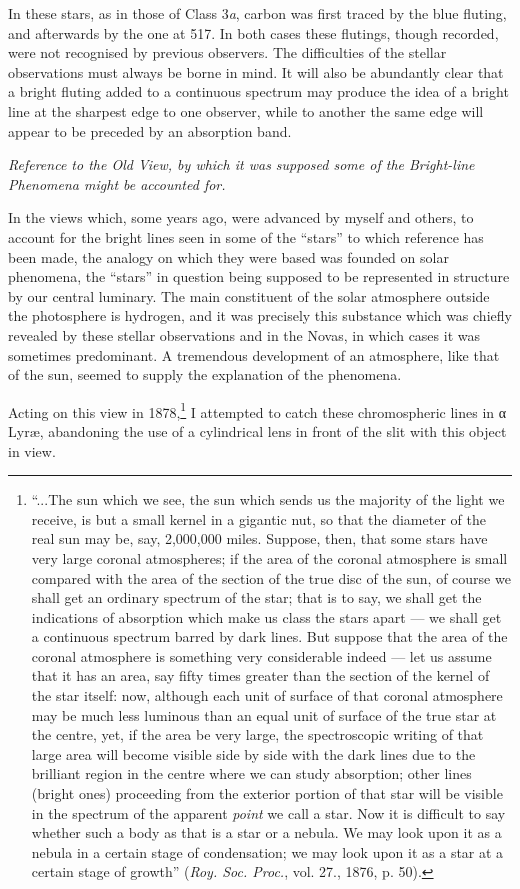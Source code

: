 \documentclass[a4paper, 12pt, oneside, polutonikogreek, english]{article}
\begin{document}
In these stars, as in those of Class 3\emph{a}, carbon was first traced by the blue fluting, and afterwards by the one at 517. In both cases these flutings, though recorded, were not recognised by previous observers. The difficulties of the stellar observations must always be borne in mind. It will also be abundantly clear that a bright fluting added to a continuous spectrum may produce the idea of a bright line at the sharpest edge to one observer, while to another the same edge will appear to be preceded by an absorption band.

\emph{Reference to the Old View, by which it was supposed some of the Bright-line Phenomena might be accounted for.}

In the views which, some years ago, were advanced by myself and others, to account for the bright lines seen in some of the ``stars'' to which reference has been made, the analogy on which they were based was founded on solar phenomena, the ``stars'' in question being supposed to be represented in structure by our central luminary. The main constituent of the solar atmosphere outside the photosphere is hydrogen, and it was precisely this substance which was chiefly revealed by these stellar observations and in the Novas, in which cases it was sometimes predominant. A tremendous development of an atmosphere, like that of the sun, seemed to supply the explanation of the phenomena.

Acting on this view in 1878,\footnote{``...The sun which we see, the sun which sends us the majority of the light we receive, is but a small kernel in a gigantic nut, so that the diameter of the real sun may be, say, 2,000,000 miles. Suppose, then, that some stars have very large coronal atmospheres; if the area of the coronal atmosphere is small compared with the area of the section of the true disc of the sun, of course we shall get an ordinary spectrum of the star; that is to say, we shall get the indications of absorption which make us class the stars apart --- we shall get a continuous spectrum barred by dark lines. But suppose that the area of the coronal atmosphere is something very considerable indeed --- let us assume that it has an area, say fifty times greater than the section of the kernel of the star itself: now, although each unit of surface of that coronal atmosphere may be much less luminous than an equal unit of surface of the true star at the centre, yet, if the area be very large, the spectroscopic writing of that large area will become visible side by side with the dark lines due to the brilliant region in the centre where we can study absorption; other lines (bright ones) proceeding from the exterior portion of that star will be visible in the spectrum of the apparent \emph{point} we call a star. Now it is difficult to say whether such a body as that is a star or a nebula. We may look upon it as a nebula in a certain stage of condensation; we may look upon it as a star at a certain stage of growth'' (\emph{Roy. Soc. Proc.}, vol. 27., 1876, p. 50).} I attempted to catch these chromospheric lines in α Lyræ, abandoning the use of a cylindrical lens in front of the slit with this object in view.
\end{document}
